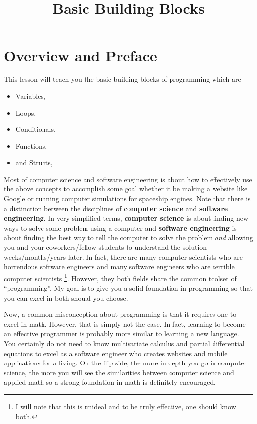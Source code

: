 \documentclass{article}
\title{Basic Building Blocks}
\begin{document}
\maketitle

\section{Overview and Preface}

This lesson will teach you the basic building blocks of programming which are
\begin{itemize}
\item Variables,
\item Loops,
\item Conditionals,
\item Functions,
\item and Structs,
\end{itemize}
Most of computer science and software engineering is about how to effectively use the above concepts to accomplish some goal whether it be making a website like Google or running computer simulations for spaceship engines.
Note that there is a distinction between the disciplines of \textbf{computer science} and \textbf{software engineering}.
In very simplified terms, \textbf{computer science} is about finding new ways to solve some problem using a computer and \textbf{software engineering} is about finding the best way to tell the computer to solve the problem \textit{and} allowing you and your coworkers/fellow students to understand the solution weeks/months/years later.
In fact, there are many computer scientists who are horrendous software engineers and many software engineers who are terrible computer scientists \footnote{I will note that this is unideal and to be truly effective, one should know both.}.
However, they both fields share the common toolset of ``programming''.
My goal is to give you a solid foundation in programming so that you can excel in both should you choose.

Now, a common misconception about programming is that it requires one to excel in math.
However, that is simply not the case.
In fact, learning to become an effective programmer is probably more similar to learning a new language.
You certainly do not need to know multivariate calculus and partial differential equations to excel as a software engineer who creates websites and mobile applications for a living.
On the flip side, the more in depth you go in computer science, the more you will see the similarities between computer science and applied math so a strong foundation in math is definitely encouraged.
\end{document}
